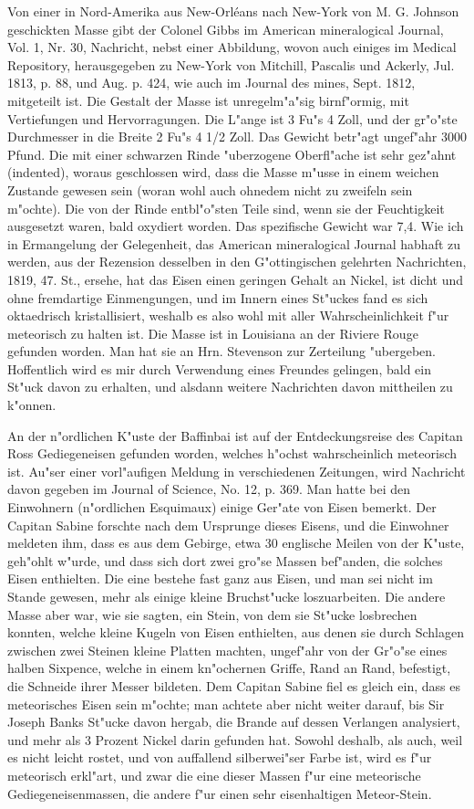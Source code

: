 \documentclass[a4paper, 11pt, oneside, polutonikogreek, german]{article}
\begin{document}
Von einer in Nord-Amerika aus New-Orléans nach New-York von M. G. Johnson geschickten Masse gibt der Colonel Gibbs im American mineralogical Journal, Vol. 1, Nr. 30, Nachricht, nebst einer Abbildung, wovon auch einiges im Medical Repository, herausgegeben zu New-York von Mitchill, Pascalis und Ackerly, Jul. 1813, p. 88, und Aug. p. 424, wie auch im Journal des mines, Sept. 1812, mitgeteilt ist. Die Gestalt der Masse ist unregelm"a"sig birnf"ormig, mit Vertiefungen und Hervorragungen. Die L"ange ist 3 Fu"s 4 Zoll, und der gr"o"ste Durchmesser in die Breite 2 Fu"s 4 1/2 Zoll. Das Gewicht betr"agt ungef"ahr 3000 Pfund. Die mit einer schwarzen Rinde "uberzogene Oberfl"ache ist sehr gez"ahnt (indented), woraus geschlossen wird, dass die Masse m"usse in einem weichen Zustande gewesen sein (woran wohl auch ohnedem nicht zu zweifeln sein m"ochte). Die von der Rinde entbl"o"sten Teile sind, wenn sie der Feuchtigkeit ausgesetzt waren, bald oxydiert worden. Das spezifische Gewicht war 7,4. Wie ich in Ermangelung der Gelegenheit, das American mineralogical Journal habhaft zu werden, aus der Rezension desselben in den G"ottingischen gelehrten Nachrichten, 1819, 47. St., ersehe, hat das Eisen einen geringen Gehalt an Nickel, ist dicht und ohne fremdartige Einmengungen, und im Innern eines St"uckes fand es sich oktaedrisch kristallisiert, weshalb es also wohl mit aller Wahrscheinlichkeit f"ur meteorisch zu halten ist. Die Masse ist in Louisiana an der Riviere Rouge gefunden worden. Man hat sie an Hrn. Stevenson zur Zerteilung "ubergeben. Hoffentlich wird es mir durch Verwendung eines Freundes gelingen, bald ein St"uck davon zu erhalten, und alsdann weitere Nachrichten davon mittheilen zu k"onnen.

An der n"ordlichen K"uste der Baffinbai ist auf der Entdeckungsreise des Capitan Ross Gediegeneisen gefunden worden, welches h"ochst wahrscheinlich meteorisch ist. Au"ser einer vorl"aufigen Meldung in verschiedenen Zeitungen, wird Nachricht davon gegeben im Journal of Science, No. 12, p. 369. Man hatte bei den Einwohnern (n"ordlichen Esquimaux) einige Ger"ate von Eisen bemerkt. Der Capitan Sabine forschte nach dem Ursprunge dieses Eisens, und die Einwohner meldeten ihm, dass es aus dem Gebirge, etwa 30 englische Meilen von der K"uste, geh"ohlt w"urde, und dass sich dort zwei gro"se Massen bef"anden, die solches Eisen enthielten. Die eine bestehe fast ganz aus Eisen, und man sei nicht im Stande gewesen, mehr als einige kleine Bruchst"ucke loszuarbeiten. Die andere Masse aber war, wie sie sagten, ein Stein, von dem sie St"ucke losbrechen konnten, welche kleine Kugeln von Eisen enthielten, aus denen sie durch Schlagen zwischen zwei Steinen kleine Platten machten, ungef"ahr von der Gr"o"se eines halben Sixpence, welche in einem kn"ochernen Griffe, Rand an Rand, befestigt, die Schneide ihrer Messer bildeten. Dem Capitan Sabine fiel es gleich ein, dass es meteorisches Eisen sein m"ochte; man achtete aber nicht weiter darauf, bis Sir Joseph Banks St"ucke davon hergab, die Brande auf dessen Verlangen analysiert, und mehr als 3 Prozent Nickel darin gefunden hat. Sowohl deshalb, als auch, weil es nicht leicht rostet, und von auffallend silberwei"ser Farbe ist, wird es f"ur meteorisch erkl"art, und zwar die eine dieser Massen f"ur eine meteorische Gediegeneisenmassen, die andere f"ur einen sehr eisenhaltigen Meteor-Stein.
\end{document}
